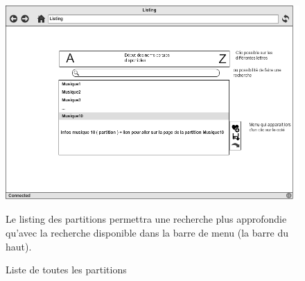 \begin{figure}[H]
\centering
\includegraphics[scale=0.5]{Listing}
\caption{Liste de toutes les partitions}

Le listing des partitions permettra une recherche plus approfondie qu'avec la recherche disponible dans la barre de menu (la barre du haut).

\end{figure}

